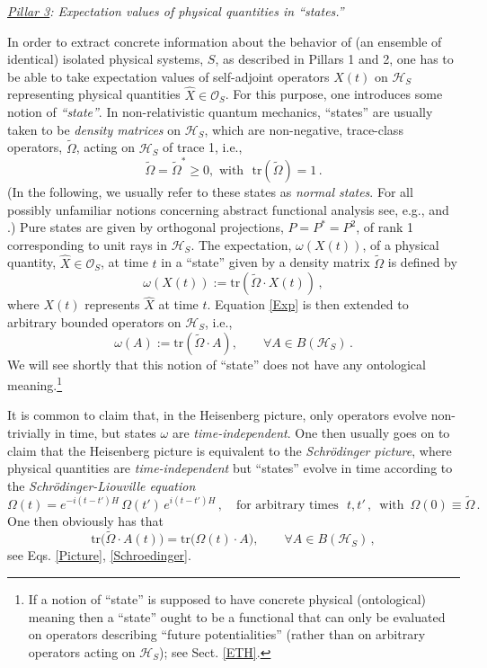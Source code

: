 \documentclass[a4paper,11pt]{article}
\begin{document}
\textit{\underline{Pillar 3}: Expectation values of physical quantities in ``states.''}

In order to extract concrete information about the behavior of (an ensemble of identical) isolated physical systems, $S$, 
as described in Pillars 1 and 2, one has to be able to take expectation values of self-adjoint operators $X(t)$ on 
$\mathcal{H}_S$ representing physical quantities $\hat{X} \in \mathcal{O}_S$. For this purpose, one introduces 
some notion of \textit{``state''}. In non-relativistic quantum mechanics, ``states'' are usually taken to be 
\textit{density matrices} on $\mathcal{H}_S$, which are non-negative, trace-class operators, $\widetilde{\Omega}$, 
acting on $\mathcal{H}_S$ of trace 1, i.e.,
\begin{equation}\label{density matrix}
\widetilde{\Omega} = \widetilde{\Omega}^{*} \geq 0,\,\,\text {with }\,\, \text{tr}(\widetilde{\Omega}) =1\,.
\end{equation}
(In the following, we usually refer to these states as \textit{normal states}. For all possibly unfamiliar notions concerning  abstract functional analysis see, e.g.,  \cite{Lanford} and \cite{Takesaki}.) Pure states are given by orthogonal projections, $P=P^{*}=P^{2}$, of rank 1 corresponding to unit rays in $\mathcal{H}_S$.
The expectation, $\omega(X(t))$, of a physical quantity, $\hat{X}\in \mathcal{O}_S$, at time $t$ in a ``state'' given by a density matrix $\widetilde{\Omega}$ is defined by
\begin{equation}\label{Exp}
\omega(X(t)):= \text{tr}(\widetilde{\Omega}\cdot X(t))\,, 
\end{equation}
where $X(t)$ represents $\hat{X}$ at time $t$. Equation \eqref{Exp} is then extended to arbitrary bounded operators on $\mathcal{H}_S$, i.e., 
$$\omega(A):= \text{tr}(\widetilde{\Omega}\cdot A), \qquad \forall A \in B(\mathcal{H}_S)\,.$$
We will see shortly that this notion of ``state'' does not have any ontological meaning.\footnote{If a notion of ``state'' is 
supposed to have concrete physical (ontological) meaning then a ``state'' ought to be a functional that can only be evaluated 
on operators describing ``future potentialities'' (rather than on arbitrary operators acting on $\mathcal{H}_S$); 
see Sect. \ref{ETH}.}

It is common to claim that, in the Heisenberg picture, only operators evolve non-trivially in time, but states $\omega$ are \textit{time-independent}. One then usually goes on to claim that the Heisenberg picture is equivalent to the \textit{Schr\"odinger picture}, where physical quantities are \textit{time-independent} but ``states'' evolve in time according to the \textit{Schr\"odinger-Liouville equation}
\begin{equation}\label{Schroedinger}
\Omega(t)= e^{-i(t-t')H} \,\Omega(t') \, e^{i(t-t')H}\,, \quad \text{for arbitrary times }\,\, t, t'\,, \, \text{ with }\, \Omega(0)\equiv \widetilde{\Omega}\,.
\end{equation}
One then obviously has that 
$$\text{tr}\big(\widetilde{\Omega}\cdot A(t)\big)= \text{tr}\big(\Omega(t)\cdot A\big), \qquad \forall A \in B(\mathcal{H}_S)\,,$$
see Eqs. \eqref{Picture}, \eqref{Schroedinger}.
\end{document}
